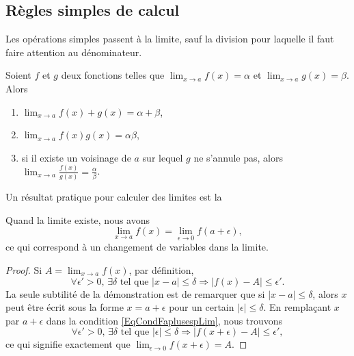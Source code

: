 
\subsection{Règles simples de calcul}

Les opérations simples passent à la limite, sauf la division pour laquelle il faut faire attention au dénominateur.
\begin{proposition}     \label{PropOpsSimplesLimites}
    Soient \( f\) et \( g\) deux fonctions telles que \( \lim_{x\to a} f(x)=\alpha\) et \( \lim_{x\to a} g(x)=\beta\). Alors
    \begin{enumerate}
        \item
            \( \lim_{x\to a} f(x)+g(x)=\alpha+\beta\),
        \item
            \( \lim_{x\to a} f(x)g(x)=\alpha\beta\),
        \item
            si il existe un voisinage de \( a\) sur lequel \( g\) ne s'annule pas, alors \( \lim_{x\to a} \frac{ f(x) }{ g(x) }=\frac{ \alpha }{ \beta }\).
    \end{enumerate}
\end{proposition}

Un résultat pratique pour calculer des limites est la
\begin{proposition}     \label{PropChmVarLim}
Quand la limite existe, nous avons
\[ 
  \lim_{x\to a}f(x)=\lim_{\epsilon\to 0}f(a+\epsilon),
\]
ce qui correspond à un \og changement de variables\fg{} dans la limite.
\end{proposition}

\begin{proof}
Si $A=\lim_{x\to a}f(x)$, par définition,
\begin{equation}        \label{EqCondFaplusespLim}
\forall\epsilon'>0,\,\exists\delta\text{ tel que }| x-a |\leq\delta\Rightarrow| f(x)-A |\leq\epsilon'.
\end{equation}
La seule subtilité de la démonstration est de remarquer que si $| x-a |\leq\delta$, alors $x$ peut être écrit sous la forme $x=a+\epsilon$ pour un certain $| \epsilon |\leq\delta$. En remplaçant $x$ par $a+\epsilon$ dans la condition \ref{EqCondFaplusespLim}, nous trouvons 
\begin{equation}
\forall\epsilon'>0,\,\exists\delta\text{ tel que }| \epsilon |\leq\delta\Rightarrow| f(x+\epsilon)-A |\leq\epsilon',
\end{equation}
ce qui signifie exactement que $\lim_{\epsilon\to 0}f(x+\epsilon)=A$.   
\end{proof}

